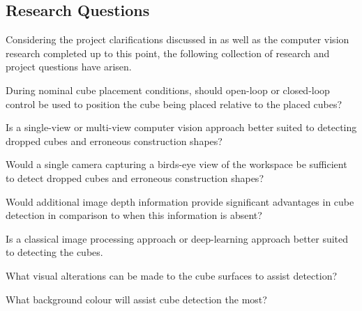 \subsection{Research Questions}
Considering the project clarifications discussed in  as well as the computer vision research completed up to this point, the following collection of research and project questions have arisen.

\begin{compactitem}
    \item During nominal cube placement conditions, should open-loop or closed-loop control be used to position the cube being placed relative to the placed cubes?
    \item Is a single-view or multi-view computer vision approach better suited to detecting dropped cubes and erroneous construction shapes?
    \item Would a single camera capturing a birds-eye view of the workspace be sufficient to detect dropped cubes and erroneous construction shapes?
    \item Would additional image depth information provide significant advantages in cube detection in comparison to when this information is absent?
    \item Is a classical image processing approach or deep-learning approach better suited to detecting the cubes.
    \item What visual alterations can be made to the cube surfaces to assist detection?
    \item What background colour will assist cube detection the most?
\end{compactitem}

\pendsign